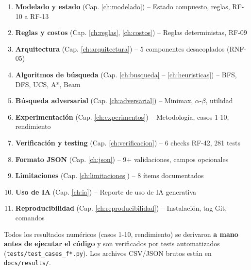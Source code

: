 \begin{enumerate}
\item \textbf{Modelado y estado} (Cap. \ref{ch:modelado}) -- Estado compuesto, reglas, RF-10 a RF-13
\item \textbf{Reglas y costos} (Cap. \ref{ch:reglas}, \ref{ch:costos}) -- Reglas deterministas, RF-09
\item \textbf{Arquitectura} (Cap. \ref{ch:arquitectura}) -- 5 componentes desacoplados (RNF-05)
\item \textbf{Algoritmos de búsqueda} (Cap. \ref{ch:busqueda} -- \ref{ch:heuristicas}) -- BFS, DFS, UCS, A*, Beam
\item \textbf{Búsqueda adversarial} (Cap. \ref{ch:adversarial}) -- Minimax, $\alpha$-$\beta$, utilidad
\item \textbf{Experimentación} (Cap. \ref{ch:experimentos}) -- Metodología, casos 1-10, rendimiento
\item \textbf{Verificación y testing} (Cap. \ref{ch:verificacion}) -- 6 checks RF-42, 281 tests
\item \textbf{Formato JSON} (Cap. \ref{ch:json}) -- 9+ validaciones, campos opcionales
\item \textbf{Limitaciones} (Cap. \ref{ch:limitaciones}) -- 8 ítems documentados
\item \textbf{Uso de IA} (Cap. \ref{ch:ia}) -- Reporte de uso de IA generativa
\item \textbf{Reproducibilidad} (Cap. \ref{ch:reproducibilidad}) -- Instalación, tag Git, comandos
\end{enumerate}

Todos los resultados numéricos (casos 1-10, rendimiento) se derivaron \textbf{a mano antes de
ejecutar el código} y son verificados por tests automatizados (\texttt{tests/test\_cases\_f*.py}).
Los archivos CSV/JSON brutos están en \texttt{docs/results/}.